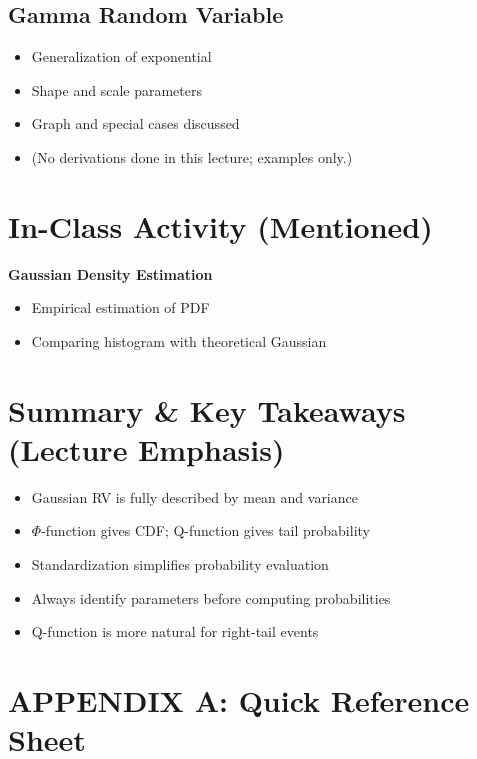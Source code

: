 \documentclass[11pt]{article}
\begin{document}
\subsection{Gamma Random Variable}
\begin{itemize}
    \item Generalization of exponential
    \item Shape and scale parameters
    \item Graph and special cases discussed
    \item (No derivations done in this lecture; examples only.)
\end{itemize}

\section{In-Class Activity (Mentioned)}
\textbf{Gaussian Density Estimation}
\begin{itemize}
    \item Empirical estimation of PDF
    \item Comparing histogram with theoretical Gaussian
\end{itemize}

\section{Summary \& Key Takeaways (Lecture Emphasis)}
\begin{itemize}
    \item Gaussian RV is fully described by mean and variance
    \item $\Phi$-function gives CDF; Q-function gives tail probability
    \item Standardization simplifies probability evaluation
    \item Always identify parameters before computing probabilities
    \item Q-function is more natural for right-tail events
\end{itemize}

\newpage
\section*{APPENDIX A: Quick Reference Sheet}
\end{document}

